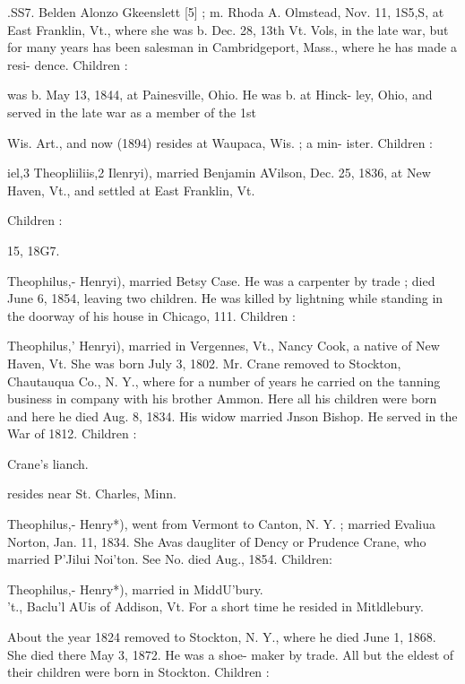 \documentclass{book}
\begin{document}
.SS7. Belden Alonzo Gkeenslett [5] ; m. Rhoda A. Olmstead, Nov. 
11, 1S5,S, at East Franklin, Vt., where she was b. Dec. 28, 
13th Vt. Vols, in the late war, but for many years has been 
salesman in Cambridgeport, Mass., where he has made a resi- 
dence. Children : 





was b. May 13, 1844, at Painesville, Ohio. He was b. at Hinck- 
ley, Ohio, and served in the late war as a member of the 1st 




Wis. Art., and now (1894) resides at Waupaca, Wis. ; a min- 
ister. Children : 





iel,3 Theopliiliis,2 Ilenryi), married Benjamin AVilson, Dec. 25, 
1836, at New Haven, Vt., and settled at East Franklin, Vt. 

Children : 



15, 18G7. 

Theophilus,- Henryi), married Betsy Case. He was a carpenter 
by trade ; died June 6, 1854, leaving two children. He was 
killed by lightning while standing in the doorway of his house in 
Chicago, 111. Children : 


Theophilus,' Henryi), married in Vergennes, Vt., Nancy Cook, 
a native of New Haven, Vt. She was born July 3, 1802. Mr. 
Crane removed to Stockton, Chautauqua Co., N. Y., where for a 
number of years he carried on the tanning business in company 
with his brother Ammon. Here all his children were born and 
here he died Aug. 8, 1834. His widow married Jnson Bishop. 
He served in the War of 1812. Children : 



Crane's lianch. 

resides near St. Charles, Minn. 

Theophilus,- Henry*), went from Vermont to Canton, N. Y. ; 
married Evaliua Norton, Jan. 11, 1834. She Avas daugliter of 
Dency or Prudence Crane, who married P'Jilui Noi'ton. See No. 
died Aug., 1854. Children: 





Theophilus,- Henry*), married in MiddU'bury. \\'t., Baclu'l AUis 
of Addison, Vt. For a short time he resided in Mitldlebury. 




About the year 1824 removed to Stockton, N. Y., where he died 
June 1, 1868. She died there May 3, 1872. He was a shoe- 
maker by trade. All but the eldest of their children were born 
in Stockton. Children : 
\end{document}
